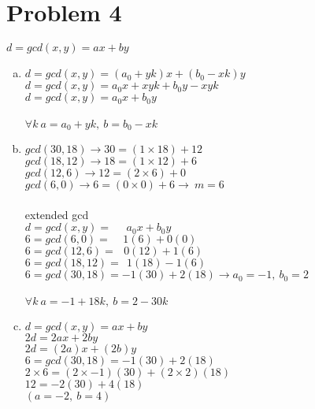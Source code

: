 \documentclass[11pt,letterpaper]{article}
\begin{document}
\section*{Problem 4}
$d=gcd(x,y)=ax+by$\\
\begin{enumerate}[(a)]
\item
$d=gcd(x,y)=(a_0 +yk)x+(b_0-xk)y$\\
$d=gcd(x,y)=a_0 x +xyk+b_0 y-xyk$\\
$d=gcd(x,y)=a_0 x+b_0 y$\\
\\
$\forall k~a=a_0 +yk,~b=b_0-xk$\\
\item
$gcd(30,18)\rightarrow 30 = (1\times18)+12$\\
$gcd(18,12)\rightarrow 18 = (1\times12)+6$\\
$gcd(12,6)\rightarrow 12 = (2\times6)+0$\\
$gcd(6,0)\rightarrow 6 = (0\times0)+6\rightarrow~m=6$\\
\\
extended gcd\\
$d=gcd(x,y)=~~~~~~a_0x+b_0y$\\
$6=gcd(6,0)=~~~~~1(6)+0(0)$\\
$6=gcd(12,6)=~~~0(12)+1(6)$\\
$6=gcd(18,12)=~~1(18)-1(6)$\\
$6=gcd(30,18)=-1(30)+2(18)\rightarrow a_0=-1,~b_0=2$\\
\\
$\forall k~a=-1+18k,~b=2-30k$\\
\item
$d=gcd(x,y)=ax+by$\\
$2d=2ax+2by$\\
$2d=(2a)x+(2b)y$\\
$6=gcd(30,18)=-1(30)+2(18)$\\
$2\times6=(2\times-1)(30)+(2\times2)(18)$\\
$12=-2(30)+4(18)$\\
$(a=-2,~b=4)$
\end{enumerate}
\clearpage
\end{document}
